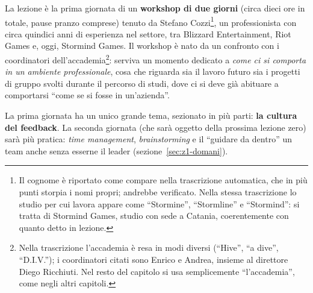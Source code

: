 La lezione è la prima giornata di un \textbf{workshop di due giorni} (circa
dieci ore in totale, pause pranzo comprese) tenuto da Stefano
Cozzi\footnote{Il cognome è riportato come compare nella trascrizione
automatica, che in più punti storpia i nomi propri; andrebbe verificato.
Nella stessa trascrizione lo studio per cui lavora appare come
``Stormine'', ``Stormline'' e ``Stormind'': si tratta di Stormind Games,
studio con sede a Catania, coerentemente con quanto detto in lezione.}, un
professionista con circa quindici anni di esperienza nel settore, tra
Blizzard Entertainment, Riot Games e, oggi, Stormind Games. Il workshop è
nato da un confronto con i coordinatori dell'accademia\footnote{Nella
trascrizione l'accademia è resa in modi diversi (``Hive'', ``a dive'',
``D.I.V.''); i coordinatori citati sono Enrico e Andrea, insieme al
direttore Diego Ricchiuti. Nel resto del capitolo si usa semplicemente
``l'accademia'', come negli altri capitoli.}: serviva un momento dedicato a
\emph{come ci si comporta in un ambiente professionale}, cosa che riguarda sia
il lavoro futuro sia i progetti di gruppo svolti durante il percorso di
studi, dove ci si deve già abituare a comportarsi ``come se si fosse in
un'azienda''.

La prima giornata ha un unico grande tema, sezionato in più parti:
\textbf{la cultura del feedback}. La seconda giornata (che sarà oggetto della
prossima lezione zero) sarà più pratica: \emph{time management},
\emph{brainstorming} e il ``guidare da dentro'' un team anche senza esserne
il leader (sezione~\ref{sec:z1-domani}).


